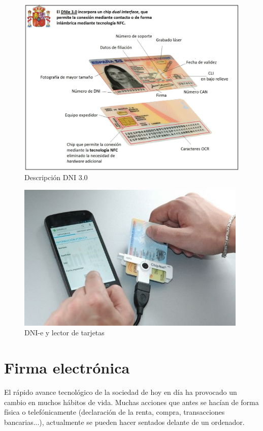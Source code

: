 \documentclass{manual}
\begin{document}
\begin{figure}[H]
	\centering
	\includegraphics[width=130mm]{images/dni3}
	\caption{Descripción DNI 3.0} 
\end{figure}



\begin{figure}[H]
	\centering
	\includegraphics[width=110mm]{images/dni-electronico}
	\caption{DNI-e y lector de tarjetas} 
\end{figure}


\vspace{0.2cm}
\section{Firma electrónica}


El rápido avance tecnológico de la sociedad de hoy en día ha provocado un cambio en muchos hábitos de vida. Muchas acciones que antes se hacían de forma física o telefónicamente (declaración de la renta, compra, transacciones bancarias...), actualmente se pueden hacer sentados delante de un ordenador. 
\end{document}
